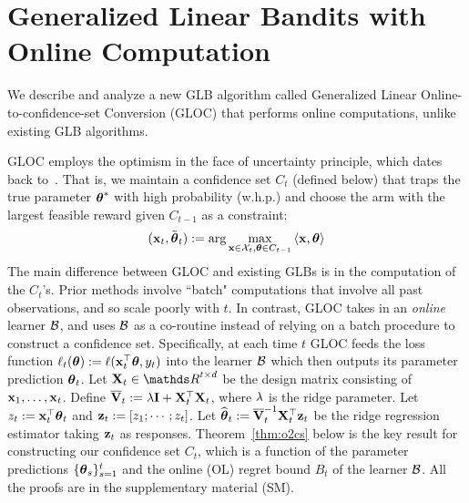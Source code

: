 \vspace{-4pt}
\section{Generalized Linear Bandits with Online Computation}
\label{sec:gloc}
\vspace{-4pt}

We describe and analyze a new GLB algorithm called Generalized Linear Online-to-confidence-set Conversion (GLOC) that performs online computations, unlike existing GLB algorithms.

GLOC employs the optimism in the face of uncertainty principle, which dates back to~\cite{auer02using}.
That is, we maintain a confidence set $C_t$ (defined below) that traps the true parameter ${{\boldsymbol \theta}}^*$ with high probability (w.h.p.) and choose the arm with the largest feasible reward given $C_{t-1}$ as a constraint:
\begin{equation}\begin{aligned} \label{eq:glocopt}
          (\mathbf{x}_t,\tilde{\boldsymbol\theta}_t) := \arg \max_{\mathbf{x}\in\mathcal{X}_t, {{\boldsymbol \theta}}\in C_{t-1}} {\langle}\mathbf{x},{{\boldsymbol \theta}} {\rangle}
\end{aligned}\end{equation}
The main difference between GLOC and existing GLBs is in the computation of the $C_t$'s. Prior methods involve ``batch" computations that involve all past observations, and so scale poorly with $t$. In contrast, GLOC takes in an \emph{online} learner $\mathcal{B}$, and uses $\mathcal{B}$ as a co-routine instead of relying on a batch procedure to construct a confidence set.
Specifically, at each time $t$ GLOC feeds the loss function $\ell_t({{\boldsymbol \theta}}) := \ell(\mathbf{x}_t^{\top}{{\boldsymbol \theta}}, y_t)$ into the learner $\mathcal{B}$ which then outputs its parameter prediction ${{\boldsymbol \theta}}_t$.
Let $\X_{t} \in \dsR^{t\times d}$ be the design matrix consisting of $\mathbf{x}_1,\ldots,\mathbf{x}_t$. 
Define $\overline{\mathbf{V}}_t := {\lambda} \mathbf{I} + \mathbf{X}_{t}^{\top}\mathbf{X}_{t} $, where ${\lambda}$ is the ridge parameter.
Let $z_t := \mathbf{x}_t^{\top}{{\boldsymbol \theta}}_t$ and  ${{\mathbf z}}_t := [z_1;\cdots;z_t]$.
Let ${{\widehat{\boldsymbol \theta}}}_t := \overline{\mathbf{V}}^{-1}_t \mathbf{X}_{t}^{\top} {{\mathbf z}}_{t}$ be the ridge regression estimator taking ${{\mathbf z}}_t$ as responses.
Theorem~\ref{thm:o2cs} below is the key result for constructing our confidence set $C_t$, which is a function of the parameter predictions $\{{{\boldsymbol \theta}}_s\}_{s=1}^t$ and the online (OL) regret bound $B_t$ of the learner $\mathcal{B}$.
All the proofs are in the supplementary material (SM).
%
